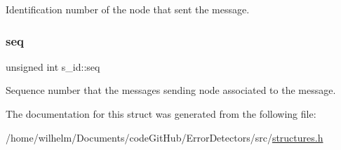 Identification number of the node that sent the message. 

\mbox{\label{structs__id_aa384054b68c5bfb4ed4a230e6a0e895f}} 
\subsubsection{\texorpdfstring{seq}{seq}}
{\footnotesize\ttfamily unsigned int s\+\_\+id\+::seq}



Sequence number that the message\textquotesingle{}s sending node associated to the message. 



The documentation for this struct was generated from the following file\+:\begin{DoxyCompactItemize}
\item 
/home/wilhelm/\+Documents/code\+Git\+Hub/\+Error\+Detectors/src/\hyperlink{structures_8h}{structures.\+h}\end{DoxyCompactItemize}
